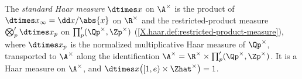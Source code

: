 The \emph{standard Haar measure} $\dtimes x$ on $\A^\times$ is the product of $\dtimes x_\infty=\dd x/\abs{x}$ on
$\R^\times$ and the restricted-product measure $\bigotimes'_p\dtimes x_p$ on $\prod'_p(\Qp^\times,\Zp^\times)$
(\cref{X.haar.def:restricted-product-measure}), where $\dtimes x_p$ is the normalized multiplicative Haar measure of $\Qp^\times$, transported
to $\A^\times$ along the identification $\A^\times=\R^\times\times\prod'_p(\Qp^\times,\Zp^\times)$. It is a Haar measure
on $\A^\times$, and $\dtimes x\bigl([1,e)\times\Zhat^\times\bigr)=1$.
